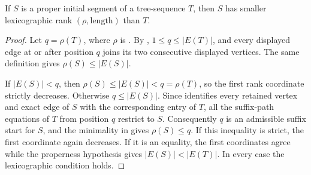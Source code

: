 \begin{helper}
If \(S\) is a proper initial segment of a tree-sequence \(T\), then
\(S\) has smaller lexicographic rank \((\rho,\text{length})\) than
\(T\).
\end{helper}
\begin{proof}
Let \(q=\rho(T)\), where \(\rho\) is
.  By
, \(1\le q\le |E(T)|\), and every displayed
edge at or after position \(q\) joins its two consecutive displayed
vertices.  The same definition gives \(\rho(S)\le |E(S)|\).

If \(|E(S)|<q\), then
\(\rho(S)\le |E(S)|<q=\rho(T)\), so the first rank coordinate strictly
decreases.  Otherwise \(q\le |E(S)|\).  Since
 identifies every retained vertex
and exact edge of \(S\) with the corresponding entry of \(T\), all the
suffix-path equations of \(T\) from position \(q\) restrict to \(S\).
Consequently \(q\) is an admissible suffix start for \(S\), and the
minimality in  gives \(\rho(S)\le q\).  If
this inequality is strict, the first coordinate again decreases.  If
it is an equality, the first coordinates agree while the properness
hypothesis gives \(|E(S)|<|E(T)|\).  In every case the lexicographic
condition  holds.
\end{proof}
